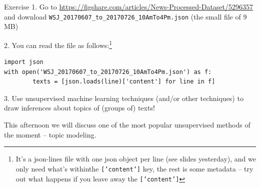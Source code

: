 \documentclass[compress]{beamer}
\begin{document}
\begin{frame}{Exercise }
1. Go to \url{https://figshare.com/articles/News-Processed-Dataset/5296357} and download \texttt{WSJ\_20170607\_to\_20170726\_10AmTo4Pm.json} (the small file of 9 MB)


2. You can read the file as follows:\footnote{It's a json-lines file with one json object per line (see slides yesterday), and we only need what's withinthe \texttt{['content']} key, the rest is some metadata -- try out what happens if you leave away the \texttt{['content']}}

\begin{lstlisting}
import json
with open('WSJ_20170607_to_20170726_10AmTo4Pm.json') as f:
        texts = [json.loads(line)['content'] for line in f]
\end{lstlisting}




3. Use unsupervised machine learning techniques (and/or other techniques) to draw inferences about topics of (groups of) texts!
\end{frame}


\begin{frame}[plain]
This afternoon we will discuss one of the most popular unsupervised methods of the moment -- topic modeling.
\end{frame}


%
%
%
%
%
%
\end{document}
